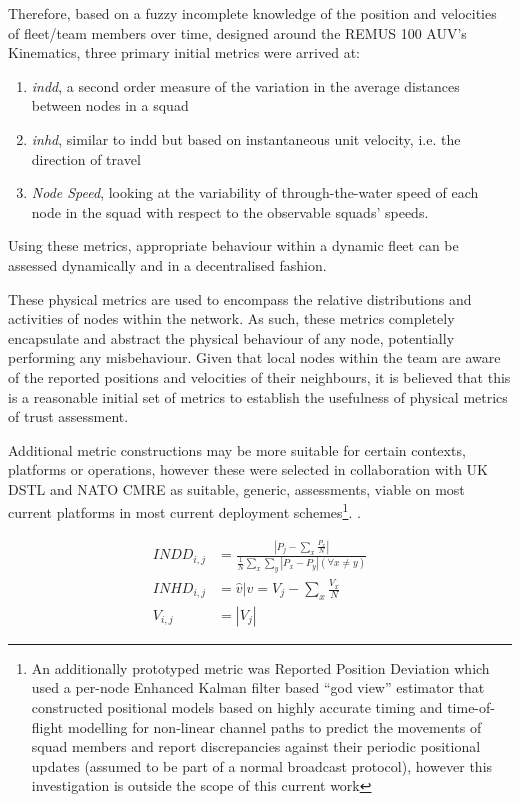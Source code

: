 Therefore, based on a fuzzy incomplete knowledge of the position and velocities of fleet/team members over time, designed around the REMUS 100 AUV’s Kinematics, three primary initial metrics were arrived at:
\begin{enumerate}
\item \emph{\acrfull{indd}}, a second order measure of the variation in the average distances between nodes in a squad
\item \emph{\acrfull{inhd}}, similar to \gls{indd} but based on instantaneous unit velocity, i.e. the direction of travel
\item \emph{Node Speed}, looking at the variability of through-the-water speed of each node in the squad with respect to the observable squads’ speeds.
\end{enumerate}
Using these metrics, appropriate behaviour within a dynamic fleet can be assessed dynamically and in a decentralised fashion.

These physical metrics are used to encompass the relative distributions and activities of nodes within the network. 
As such, these metrics completely encapsulate and abstract the physical behaviour of any node, potentially performing any misbehaviour.
Given that local nodes within the team are aware of the reported positions and velocities of their neighbours, it is believed that this is a reasonable initial set of metrics to establish the usefulness of physical metrics of trust assessment.

Additional metric constructions may be more suitable for certain contexts, platforms or operations, however these were selected in collaboration with UK DSTL and NATO CMRE as suitable, generic, assessments, viable on most current platforms in most current deployment schemes\footnote{An additionally prototyped metric was Reported Position Deviation which used a per-node Enhanced Kalman filter based ``god view'' estimator that constructed positional models based on highly accurate timing and time-of-flight modelling for non-linear channel paths to predict the movements of squad members and report discrepancies against their periodic positional updates (assumed to be part of a normal broadcast protocol), however this investigation is outside the scope of this current work}.
	.

\begin{align}
  INDD_{i,j} &= \frac{|P_j - \sum_x \frac{P_x}{N}|}{\frac{1}{N}\sum_x \sum_y{|P_x - P_y| (\forall x \neq y)}}\\
  INHD_{i,j} &= \hat{v} \vert v= V_j - \sum_x{\frac{V_x}{N}}\\
  V_{i,j} &= |V_j|
\end{align}

